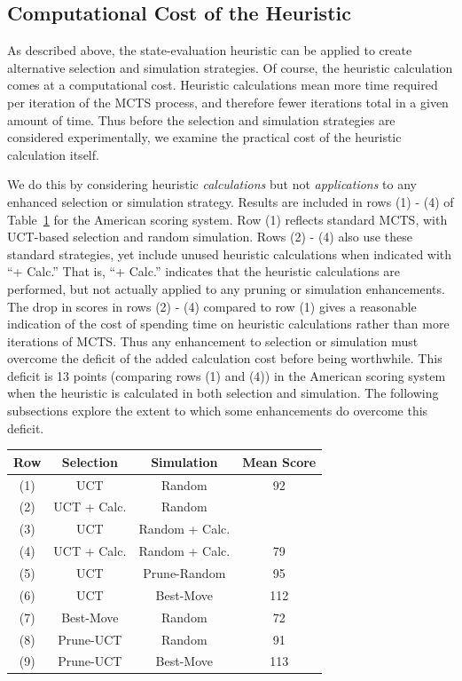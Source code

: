 \documentclass[letterpaper]{article}
\begin{document}
\subsection{Computational Cost of the Heuristic}

As described above, the state-evaluation heuristic can be applied to create alternative selection and simulation strategies. Of course, the heuristic calculation comes at a computational cost. Heuristic calculations mean more time required per iteration of the MCTS process, and therefore fewer iterations total in a given amount of time. Thus before the selection and simulation strategies are considered experimentally, we examine the practical cost of the heuristic calculation itself.

We do this by considering heuristic {\it calculations} but not {\it applications} to any enhanced selection or simulation strategy. Results are included in rows (1) - (4) of Table~\ref{tbl:SelSim} for the American scoring system. Row (1) reflects standard MCTS, with UCT-based selection and random simulation. Rows (2) - (4) also use these standard strategies, yet include unused heuristic calculations when indicated with ``+ Calc.'' That is, ``+ Calc.'' indicates that the heuristic calculations are performed, but not actually applied to any pruning or simulation enhancements. The drop in scores in rows (2) - (4) compared to row (1) gives a reasonable indication of the cost of spending time on heuristic calculations rather than more iterations of MCTS. Thus any enhancement to selection or simulation must overcome the deficit of the added calculation cost before being worthwhile. This deficit is 13 points (comparing rows (1) and (4)) in the American scoring system when the heuristic is calculated in both selection and simulation. The following subsections explore the extent to which some enhancements do overcome this deficit.

\begin{table}
\label{tbl:SelSim}
\centering
\begin{tabular}{c c c c}
\hline
{\bf Row} & {\bf Selection} & {\bf Simulation} & {\bf Mean Score} \\
\hline
\hline
(1) & UCT & Random & 92 \\
(2) & UCT + Calc. & Random & \\
(3) & UCT & Random + Calc. & \\
(4) & UCT + Calc. & Random + Calc. & 79 \\
\hline
(5) & UCT & Prune-Random & 95 \\
(6) & UCT & Best-Move & 112 \\
\hline
(7) & Best-Move & Random & 72 \\
(8) & Prune-UCT & Random & 91 \\
\hline
(9) & Prune-UCT & Best-Move & 113 \\
\hline
\end{tabular}
\end{table}
\end{document}
